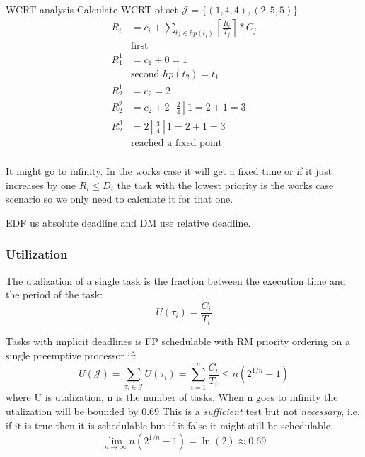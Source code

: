 \begin{exampleblock}{WCRT analysis}
  Calculate WCRT of set $\mathcal{J} = \{(1, 4, 4), (2, 5, 5)\}$ 
  \begin{align*}
    R_i &= c_i + \sum_{tj\in hp(t_i)} \left\lceil \frac{R_i}{T_j} \right\rceil *C_j \\
    &\text{first} \\
    R_1^1 &= c_1 + 0 = 1 \\
    &\text{second } hp(t_2)={t_1} \\
    R_2^1 &= c_2 = 2 \\
    R_2^2 &= c_2 + 2 [\frac{2}{4}]1 = 2 + 1 = 3 \\
    R_2^3 &= 2 \left\lceil \frac{3}{4} \right\rceil 1 = 2 + 1 = 3 \\
    &\text{reached a fixed point} \\
  \end{align*}
\end{exampleblock}

It might go to infinity. In the works case it will get a fixed time or if it just increases by one  $R_i \leq D_i$
the task with the lowest priority is the works case scenario so we only need to calculate it for that one.

EDF us absolute deadline and DM use relative deadline.


\subsubsection{Utilization}
The utalization of a single task is the fraction between the execution time and the period of the task:
\begin{equation}
  U(\tau_i) = \frac{C_i}{T_i}
\end{equation}

Tasks with implicit deadlines is FP schedulable with RM priority ordering on a single preemptive processor if:
\begin{equation}
  U(\mathcal{J}) = \sum_{\tau_i\in\mathcal{J}} U(\tau_i) = \sum_{i=1}^n \frac{C_i}{T_i} \leq n(2^{1/n}-1)
\end{equation}
where U is utalization, n is the number of tasks. When n goes to infinity the utalization will be bounded by $0.69$
This is a \textit{sufficient} test but not \textit{necessary}, i.e. if it is true then it is schedulable but if it false it might still be schedulable.
\begin{equation}
  \lim_{n\to\infty} n(2^{1/n}-1) = \ln(2) \approx 0.69
\end{equation}

